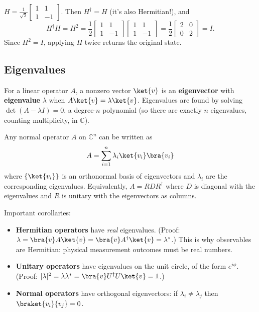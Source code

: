 \documentclass[oneside]{academica}
\begin{document}
\begin{example*}
  $H=\frac{1}{\sqrt{2}}\begin{bmatrix}1&1\\1&-1\end{bmatrix}$.
  Then $H^\dagger=H$ (it's also Hermitian!), and
  \begin{equation*}
    H^\dagger H = H^2 = \frac{1}{2}\begin{bmatrix}1&1\\1&-1\end{bmatrix}
    \begin{bmatrix}1&1\\1&-1\end{bmatrix}
    =\frac{1}{2}\begin{bmatrix}2&0\\0&2\end{bmatrix}=I.
  \end{equation*}
  Since $H^2=I$, applying $H$ twice returns the original state.
\end{example*}

\subsection{Eigenvalues}

For a linear operator $A$, a nonzero vector $\ket{v}$ is an
\textbf{eigenvector} with \textbf{eigenvalue} $\lambda$ when
$A\ket{v}=\lambda\ket{v}$.
Eigenvalues are found by solving
$\det(A-\lambda I)=0$, a degree-$n$ polynomial (so there are exactly
$n$ eigenvalues, counting multiplicity, in $\mathbb{C}$).

\begin{theorem}\label{th:spectral}
  Any normal operator $A$ on $\mathbb{C}^n$ can be written as
  \begin{equation*}
    A = \sum_{i=1}^n \lambda_i \ket{v_i}\bra{v_i}
  \end{equation*}
  where $\{\ket{v_i}\}$ is an orthonormal basis of eigenvectors and
  $\lambda_i$ are the corresponding eigenvalues.
Equivalently,
  $A=R D R^\dagger$ where $D$ is diagonal with the eigenvalues and
  $R$ is unitary with the eigenvectors as columns.
\end{theorem}

Important corollaries:
\begin{itemize}
  \item \textbf{Hermitian operators} have \emph{real} eigenvalues.
    (Proof: $\lambda=\bra{v}A\ket{v}=\bra{v}A^\dagger\ket{v}=\lambda^*$.)
    This is why observables are Hermitian: physical measurement
    outcomes must be real numbers.
  \item \textbf{Unitary operators} have eigenvalues on the unit circle,
    of the form $e^{i\phi}$.
(Proof: $|\lambda|^2=\lambda\lambda^*=\bra{v}U^\dagger U\ket{v}=1$.)
  \item \textbf{Normal operators} have orthogonal eigenvectors: if $\lambda_i\neq\lambda_j$ then $\braket{v_i}{v_j}=0$.
\end{itemize}
\end{document}
